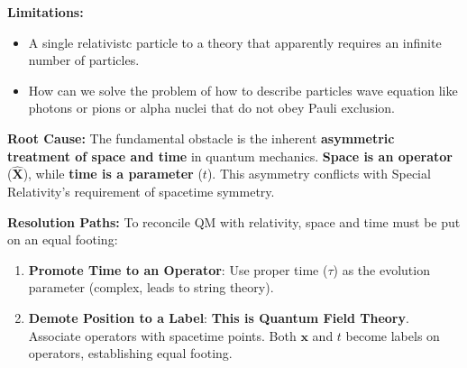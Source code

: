 \documentclass[12pt,a4paper]{article}
\numberwithin{equation}{subsection}
\begin{document}
\textbf{Limitations:}
\begin{itemize}
    \item A single relativistc particle to a theory that apparently requires an infinite number of particles.
    \item How can we solve the problem of how to describe particles wave equation like photons or pions or alpha nuclei that do not obey Pauli exclusion.
\end{itemize}

\noindent\textbf{Root Cause:} The fundamental obstacle is the inherent \textbf{asymmetric treatment of space and time} in quantum mechanics. \textbf{Space is an operator} ($\hat{\mathbf{X}}$), while \textbf{time is a parameter} ($t$). This asymmetry conflicts with Special Relativity's requirement of spacetime symmetry.

\noindent\textbf{Resolution Paths:} To reconcile QM with relativity, space and time must be put on an equal footing:
\begin{enumerate}
    \item \textbf{Promote Time to an Operator}: Use proper time ($\tau$) as the evolution parameter (complex, leads to string theory).
    \item \textbf{Demote Position to a Label}: \textbf{This is Quantum Field Theory}. Associate operators with spacetime points. Both $\mathbf{x}$ and $t$ become labels on operators, establishing equal footing.
\end{enumerate}
\end{document}

